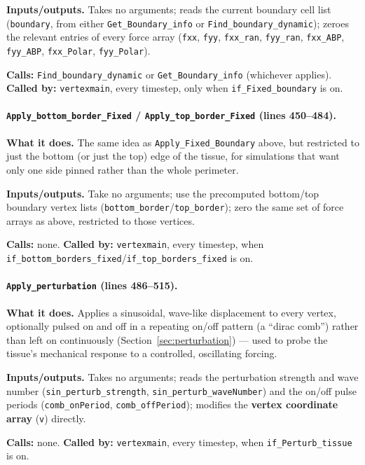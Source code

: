 \documentclass[11pt]{article}
\begin{document}
\textbf{Inputs/outputs.} Takes no arguments; reads the current boundary cell list
(\texttt{boundary}, from either \texttt{Get\_Boundary\_info} or
\texttt{Find\_boundary\_dynamic}); zeroes the relevant entries of every force array
(\texttt{fxx}, \texttt{fyy}, \texttt{fxx\_ran}, \texttt{fyy\_ran}, \texttt{fxx\_ABP},
\texttt{fyy\_ABP}, \texttt{fxx\_Polar}, \texttt{fyy\_Polar}).

\textbf{Calls:} \texttt{Find\_boundary\_dynamic} or \texttt{Get\_Boundary\_info}
(whichever applies). \textbf{Called by:} \texttt{vertexmain}, every timestep, only when
\texttt{if\_Fixed\_boundary} is on.

\paragraph{\texttt{Apply\_bottom\_border\_Fixed} / \texttt{Apply\_top\_border\_Fixed}
(lines 450--484).}
\textbf{What it does.} The same idea as \texttt{Apply\_Fixed\_Boundary} above, but
restricted to just the bottom (or just the top) edge of the tissue, for simulations
that want only one side pinned rather than the whole perimeter.

\textbf{Inputs/outputs.} Take no arguments; use the precomputed bottom/top boundary
vertex lists (\texttt{bottom\_border}/\texttt{top\_border}); zero the same set of force
arrays as above, restricted to those vertices.

\textbf{Calls:} none. \textbf{Called by:} \texttt{vertexmain}, every timestep, when
\texttt{if\_bottom\_borders\_fixed}/\texttt{if\_top\_borders\_fixed} is on.

\paragraph{\texttt{Apply\_perturbation} (lines 486--515).}
\textbf{What it does.} Applies a sinusoidal, wave-like displacement to every vertex,
optionally pulsed on and off in a repeating on/off pattern (a ``dirac comb'') rather
than left on continuously (Section~\ref{sec:perturbation}) --- used to probe the tissue's
mechanical response to a controlled, oscillating forcing.

\textbf{Inputs/outputs.} Takes no arguments; reads the perturbation strength and wave
number (\texttt{sin\_perturb\_strength}, \texttt{sin\_perturb\_waveNumber}) and the
on/off pulse periods (\texttt{comb\_onPeriod}, \texttt{comb\_offPeriod}); modifies the
\textbf{vertex coordinate array} (\texttt{v}) directly.

\textbf{Calls:} none. \textbf{Called by:} \texttt{vertexmain}, every timestep, when
\texttt{if\_Perturb\_tissue} is on.
\end{document}
